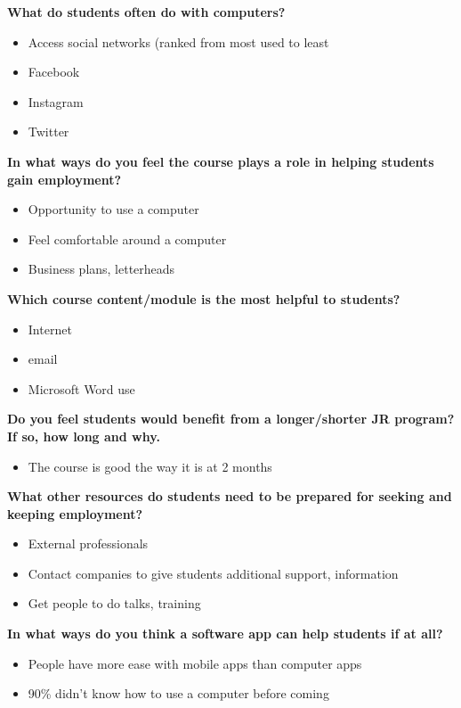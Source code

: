 \noindent\textbf{What do students often do with computers?}
\begin{itemize}
\item Access social networks (ranked from most used to least
\item Facebook
\item Instagram
\item Twitter
\end{itemize}



\noindent\textbf{In what ways do you feel the course plays a role in helping students gain employment?}
\begin{itemize}
\item Opportunity to use a computer
\item Feel comfortable around a computer
\item Business plans, letterheads
\end{itemize}

\noindent\textbf{Which course content/module is the most helpful to students?}
\begin{itemize}
\item Internet
\item email
\item Microsoft Word use
\end{itemize}

\noindent\textbf{Do you feel students would benefit from a longer/shorter JR program? If so, how long and why.}
\begin{itemize}
\item The course is good the way it is at 2 months
\end{itemize}

\noindent\textbf{What other resources do students need to be prepared for seeking and keeping employment?}
\begin{itemize}
\item External professionals
\item Contact companies to give students additional support, information
\item Get people to do talks, training
\end{itemize}

\noindent\textbf{In what ways do you think a software app can help students if at all?}
\begin{itemize}
\item People have more ease with mobile apps than computer apps
\item 90\% didn’t know how to use a computer before coming
\end{itemize}

